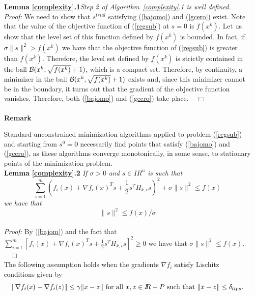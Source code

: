 \documentclass{article}
\newcommand{\half}      {\frac{1}{2}}
\newcommand{\R}         {I\!\!R}
\newcommand{\halmos}    {\hfill $\;\;\;\Box$\\}
\newcommand{\s}{s^{trial}}
\newcommand{\B}{{\cal B}}
\begin{document}
\noindent
{\bf Lemma \ref{complexity}.1}{\it Step 2 of Algorithm~\ref{complexity}.1 is well defined.}\\

\noindent
{\it Proof:}  We need to show that $\s$ satisfying (\ref{bajomo}) and (\ref{gcero}) exist. Note that the
    value of the objective function 
  of (\ref{regsub}) at $s = 0$ is $f(x^k)$. Let us show that the level set of this function defined by $f(x^k)$ is bounded.
    In fact, if $\sigma \|s\|^2 > f(x^k)$ we have that the objective function of (\ref{regsub}) is greater than 
   $f(x^k)$. Therefore, the level set defined by $f(x^k)$ is strictly contained in the ball $\B(x^k, \sqrt{f(x^k)}+1)$, which
  is a compact set. 
      Therefore, by continuity,  a minimizer in the ball 
    $\B(x^k, \sqrt{f(x^k)}+1)$ exists and, since this minimizer cannot be in the boundary, it turns out that 
    the gradient of the objective function vanishes. Therefore, both (\ref{bajomo}) and (\ref{gcero}) take place. \halmos\\


\noindent
{\bf Remark } 

Standard unconstrained minimization algorithms applied to problem (\ref{regsub}) and starting from $s^0 = 0$ necessarily find
  points that satisfy (\ref{bajomo}) and (\ref{gcero}), as these algorithms converge monotonically, in some sense,  to stationary points
  of the minimization problem. \\     



\noindent
{\bf Lemma \ref{complexity}.2} {\it If 
  $\sigma > 0 $ and $s \in \R^n$ is such that  
  \begin{equation} \label{bajom}
\sum_{i=1}^m (f_i(x) + \nabla f_i(x)^T s + \half s^T H_{k,i} s)^2 + \sigma \|s\|^2 \leq f(x)
\end{equation}  
 we have that
\begin{equation} \label{cotas}
\|s\|^2 \leq f(x)/\sigma
\end{equation}
 \\

\noindent
Proof:}  By (\ref{bajom}) and the fact that   $\sum_{i=1}^m [f_i(x) + \nabla f_i(x)^T s + \half s^T H_{k,i} s]^2 \geq 0$ we 
 have that $\sigma \|s\|^2 \leq f(x)$. \halmos
 
The following assumption holds when the gradients $\nabla f_i$ satisfy Lischitz conditions given by
\begin{equation} \label{lipschitz}
\|\nabla f_i(x) - \nabla f_i(z)\| \leq \gamma \| x - z\| \mbox{ for all } x, z \in \R-P \mbox{ such that } \|x-z\|\leq \delta_{lips}.\\
\end{equation}
\end{document}
